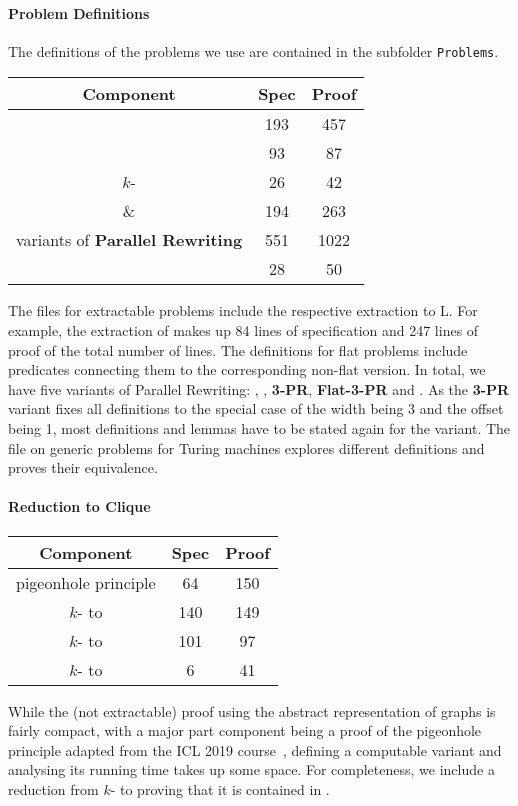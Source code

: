 \paragraph{Problem Definitions}
The definitions of the problems we use are contained in the subfolder \texttt{Problems}. 
\begin{center}
  \begin{tabular}{ccc}
    Component & Spec & Proof \\
    \midrule
    \SAT{} & 193 & 457 \\
    \fsat{} & 93 & 87 \\
    $k$-\SAT{} & 26 & 42 \\
    \Clique{} \& \FlatClique{} & 194 & 263 \\
    variants of \textbf{Parallel Rewriting} & 551 & 1022 \\
    \gennp{} & 28 & 50 \\
  \end{tabular}
\end{center}
The files for extractable problems include the respective extraction to L.
For example, the extraction of \SAT{} makes up 84 lines of specification and 247 lines of proof of the total number of lines.
The definitions for flat problems include predicates connecting them to the corresponding non-flat version. 
In total, we have five variants of Parallel Rewriting: \PR{}, \FlatPR{}, \textbf{3-PR}, \textbf{Flat-3-PR} and \BPR{}. As the \textbf{3-PR} variant fixes all definitions to the special case of the width being 3 and the offset being 1, most definitions and lemmas have to be stated again for the variant. 
The file on generic problems for Turing machines explores different definitions and proves their equivalence. 

\paragraph{Reduction to Clique}
\begin{center}
  \begin{tabular}{ccc}
    Component & Spec & Proof \\
    \midrule
    pigeonhole principle & 64 & 150 \\
    $k$-\SAT{} to \Clique{} & 140 & 149 \\
    $k$-\SAT{} to \FlatClique{} & 101 & 97 \\
    $k$-\SAT{} to \SAT{} & 6 & 41 
  \end{tabular}
\end{center}
While the (not extractable) proof using the abstract representation of graphs is fairly compact, with a major part component being a proof of the pigeonhole principle adapted from the ICL 2019 course~\cite{icl_coq}, defining a computable variant and analysing its running time takes up some space. 
For completeness, we include a reduction from $k$-\SAT{} to \SAT{} proving that it is contained in \NP{}. 

